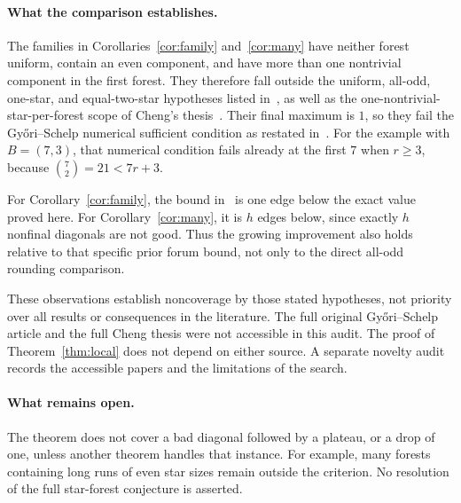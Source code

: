 \documentclass[11pt]{article}
\theoremstyle{remark}\newtheorem{remark}[theorem]{Remark}
\begin{document}
\paragraph{What the comparison establishes.}
The families in Corollaries~\ref{cor:family} and~\ref{cor:many} have neither forest uniform, contain an even component, and have more than one nontrivial component in the first forest. They therefore fall outside the uniform, all-odd, one-star, and equal-two-star hypotheses listed in~\cite{DJKR}, as well as the one-nontrivial-star-per-forest scope of Cheng's thesis~\cite{Cheng}. Their final maximum is $1$, so they fail the Gy\H{o}ri--Schelp numerical sufficient condition as restated in~\cite[Theorem 1.4]{DJKR}. For the example with $B=(7,3)$, that numerical condition fails already at the first $7$ when $r\ge3$, because $\binom72=21<7r+3$.

For Corollary~\ref{cor:family}, the bound in~\cite{rickyc} is one edge below the exact value proved here. For Corollary~\ref{cor:many}, it is $h$ edges below, since exactly $h$ nonfinal diagonals are not good. Thus the growing improvement also holds relative to that specific prior forum bound, not only to the direct all-odd rounding comparison.

These observations establish noncoverage by those stated hypotheses, not priority over all results or consequences in the literature. The full original Gy\H{o}ri--Schelp article and the full Cheng thesis were not accessible in this audit. The proof of Theorem~\ref{thm:local} does not depend on either source. A separate novelty audit records the accessible papers and the limitations of the search.

\paragraph{What remains open.}
The theorem does not cover a bad diagonal followed by a plateau, or a drop of one, unless another theorem handles that instance. For example, many forests containing long runs of even star sizes remain outside the criterion. No resolution of the full star-forest conjecture is asserted.
\end{document}
